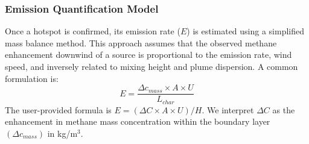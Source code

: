 \documentclass[12pt,a4paper]{article}
\begin{document}
\subsubsection{Emission Quantification Model}
Once a hotspot is confirmed, its emission rate ($E$) is estimated using a simplified mass balance method. This approach assumes that the observed methane enhancement downwind of a source is proportional to the emission rate, wind speed, and inversely related to mixing height and plume dispersion. A common formulation is:
\begin{equation}
    E = \frac{\Delta c_{mass} \times A \times U}{L_{char}}
    \label{eq:emission_rate_general}
\end{equation}
The user-provided formula is $E = (\Delta C \times A \times U) / H$. We interpret $\Delta C$ as the enhancement in methane mass concentration within the boundary layer $(\Delta c_{mass})$ in kg/m$^3$.
\end{document}
